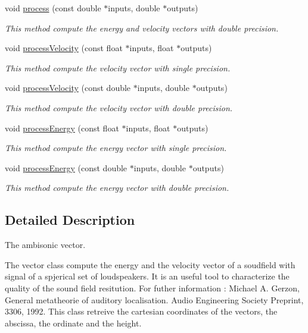 \begin{DoxyCompactItemize}
void \hyperlink{class_hoa3_d_1_1_vector_abf7d541dea71e683dda0aa494d843a64}{process} (const double $\ast$inputs, double $\ast$outputs)
\begin{DoxyCompactList}\small\item\em This method compute the energy and velocity vectors with double precision. \end{DoxyCompactList}\item 
void \hyperlink{class_hoa3_d_1_1_vector_a9c875cc6ac2171c5d8e1b8c1d466a844}{process\-Velocity} (const float $\ast$inputs, float $\ast$outputs)
\begin{DoxyCompactList}\small\item\em This method compute the velocity vector with single precision. \end{DoxyCompactList}\item 
void \hyperlink{class_hoa3_d_1_1_vector_a34ae72be81e72815e057e716a0f24d36}{process\-Velocity} (const double $\ast$inputs, double $\ast$outputs)
\begin{DoxyCompactList}\small\item\em This method compute the velocity vector with double precision. \end{DoxyCompactList}\item 
void \hyperlink{class_hoa3_d_1_1_vector_a7abd76a93ade46d069c922064f14c1b7}{process\-Energy} (const float $\ast$inputs, float $\ast$outputs)
\begin{DoxyCompactList}\small\item\em This method compute the energy vector with single precision. \end{DoxyCompactList}\item 
void \hyperlink{class_hoa3_d_1_1_vector_a28ad63d95b4d2c1ccabdada1955f5f96}{process\-Energy} (const double $\ast$inputs, double $\ast$outputs)
\begin{DoxyCompactList}\small\item\em This method compute the energy vector with double precision. \end{DoxyCompactList}\end{DoxyCompactItemize}


\subsection{Detailed Description}
The ambisonic vector. 

The vector class compute the energy and the velocity vector of a soudfield with signal of a spjerical set of loudspeakers. It is an useful tool to characterize the quality of the sound field resitution. For futher information \-: Michael A. Gerzon, General metatheorie of auditory localisation. Audio Engineering Society Preprint, 3306, 1992. This class retreive the cartesian coordinates of the vectors, the abscissa, the ordinate and the height. 

